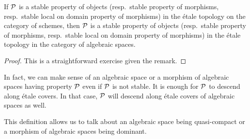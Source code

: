  \begin{corollary}[to Remark \ref{lec12R:exists_etale<=>any_map}]
   If $\P$ is a stable property of objects (resp.~stable property of morphisms,
   resp.~stable local on domain property of morphisms) in the \'etale topology on the
   category of schemes, then $\P$ is a stable property of objects (resp.~stable property
   of morphisms, resp.~stable local on domain property of morphisms) in the \'etale
   topology in the category of algebraic spaces.
 \end{corollary}
 \begin{proof}
    This is a straightforward exercise given the remark.
 \end{proof}
 \begin{remark}\label{lec12R:non-stable_properties}
   In fact, we can make sense of an algebraic space or a morphism of algebraic spaces
   having property $\P$ even if $\P$ is not stable. It is enough for $\P$ to descend
   along \'etale covers. In that case, $\P$ will descend along \'etale covers of
   algebraic spaces as well.

   This definition allows us to talk about an algebraic space
   being quasi-compact or a morphism of algebraic spaces being dominant.
 \end{remark}

